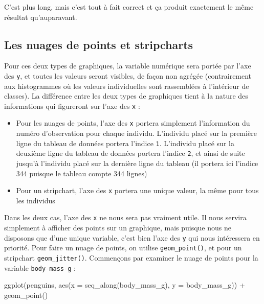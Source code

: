 \documentclass[
  a4paper,
  DIV=11,
  numbers=noendperiod,
  oneside]{scrreprt}
\newenvironment{Shaded}{}{}
\newcommand{\AttributeTok}[1]{\textcolor[rgb]{0.84,0.23,0.29}{#1}}
\newcommand{\FunctionTok}[1]{\textcolor[rgb]{0.44,0.26,0.76}{#1}}
\newcommand{\NormalTok}[1]{\textcolor[rgb]{0.14,0.16,0.18}{#1}}
\newcommand{\SpecialCharTok}[1]{\textcolor[rgb]{0.00,0.36,0.77}{#1}}
\providecommand{\tightlist}{%
  \setlength{\itemsep}{0pt}\setlength{\parskip}{0pt}}\usepackage{longtable,booktabs,array}
\begin{document}
C'est plus long, mais c'est tout à fait correct et ça produit exactement
le même résultat qu'auparavant.

\subsection{Les nuages de points et stripcharts}\label{sec-cloud}

Pour ces deux types de graphiques, la variable numérique sera portée par
l'axe des \texttt{y}, et toutes les valeurs seront visibles, de façon
non agrégée (contrairement aux histogrammes où les valeurs individuelles
sont rassemblées à l'intérieur de classes). La différence entre les deux
types de graphiques tient à la nature des informations qui figureront
sur l'axe des \texttt{x} :

\begin{itemize}
\tightlist
\item
  Pour les nuages de points, l'axe des \texttt{x} portera simplement
  l'information du numéro d'observation pour chaque individu. L'individu
  placé sur la première ligne du tableau de données portera l'indice
  \texttt{1}. L'individu placé sur la deuxième ligne du tableau de
  données portera l'indice \texttt{2}, et ainsi de suite jusqu'à
  l'individu placé sur la dernière ligne du tableau (il portera ici
  l'indice 344 puisque le tableau compte 344 lignes)
\item
  Pour un stripchart, l'axe des \texttt{x} portera une unique valeur, la
  même pour tous les individus
\end{itemize}

Dans les deux cas, l'axe des \texttt{x} ne nous sera pas vraiment utile.
Il nous servira simplement à afficher des points sur un graphique, mais
puisque nous ne disposons que d'une unique variable, c'est bien l'axe
des \texttt{y} qui nous intéressera en priorité. Pour faire un nuage de
points, on utilise \texttt{geom\_point()}, et pour un stripchart
\texttt{geom\_jitter()}. Commençons par examiner le nuage de points pour
la variable \texttt{body-mass-g} :

\begin{Shaded}
\begin{Highlighting}[]
\FunctionTok{ggplot}\NormalTok{(penguins, }\FunctionTok{aes}\NormalTok{(}\AttributeTok{x =} \FunctionTok{seq\_along}\NormalTok{(body\_mass\_g), }\AttributeTok{y =}\NormalTok{ body\_mass\_g)) }\SpecialCharTok{+}
  \FunctionTok{geom\_point}\NormalTok{()}
\end{Highlighting}
\end{Shaded}
\end{document}
